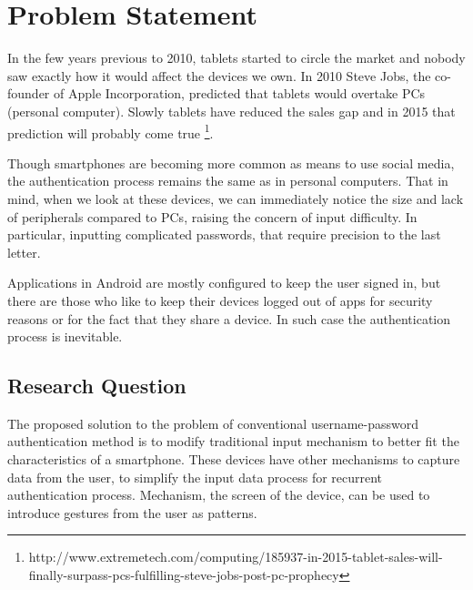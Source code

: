 
\chapter{Problem Statement} %

In the few years previous to 2010, tablets started to circle the market and nobody saw exactly how it would affect the devices we own. In 2010 Steve Jobs, the co-founder of Apple Incorporation, predicted that tablets would overtake PCs (personal computer). Slowly tablets have reduced the sales gap and in 2015 that prediction will probably come true \footnote[11]{http://www.extremetech.com/computing/185937-in-2015-tablet-sales-will-finally-surpass-pcs-fulfilling-steve-jobs-post-pc-prophecy}.

Though smartphones are becoming more common as means to use social media, the authentication process remains the same as in personal computers. That in mind, when we look at these devices, we can immediately notice the size and lack of peripherals compared to PCs, raising the concern of input difficulty. In particular, inputting complicated passwords, that require precision to the last letter. 

Applications in Android are mostly configured to keep the user signed in, but there are those who like to keep their devices logged out of apps for security reasons or for the fact that they share a device. In such case the authentication process is inevitable.




\ifpdf
    \graphicspath{{X/figures/PNG/}{X/figures/PDF/}{X/figures/}}
\else
    \graphicspath{{X/figures/EPS/}{X/figures/}}
\fi

\section{Research Question}
The proposed solution to the problem of conventional username-password authentication method is to modify traditional input mechanism to better fit the characteristics of a smartphone. These devices have other mechanisms to capture data from the user, to simplify the input data process for recurrent authentication process. Mechanism, the screen of the device, can be used to introduce gestures from the user as patterns. 

